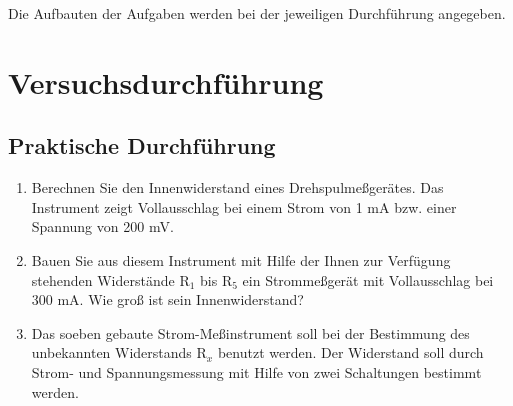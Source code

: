 \documentclass[12pt]{scrartcl}
\begin{document}
Die Aufbauten der Aufgaben werden bei der jeweiligen Durchführung angegeben.

\section{Versuchsdurchführung}


\subsection{Praktische Durchführung}

\begin{enumerate}

	\item 
	Berechnen Sie den Innenwiderstand 				eines Drehspulmeßgerätes. Das Instrument
	zeigt Vollausschlag bei einem Strom von 			1 mA bzw. einer Spannung von 200 mV.
	\item
	Bauen Sie aus diesem Instrument mit 				Hilfe der Ihnen zur Verfügung stehenden 			Widerstände $\text{R}_1$ bis 					$\text{R}_5$ ein 								Strommeßgerät mit Vollausschlag bei 300 			mA. Wie groß ist sein Innenwiderstand?
	\item
	Das soeben gebaute Strom-Meßinstrument 			soll bei der Bestimmung des unbekannten 			Widerstands $\text{R}_x$ benutzt werden. 	Der Widerstand soll durch Strom- und 			Spannungsmessung mit Hilfe von zwei 				Schaltungen bestimmt werden.
	

\end{enumerate}
\end{document}
